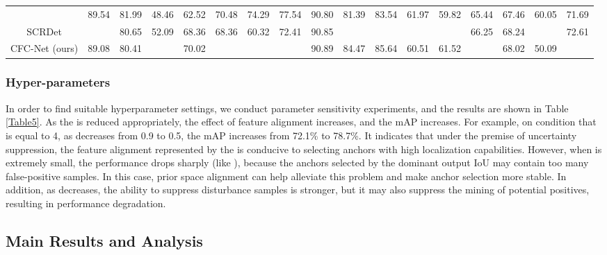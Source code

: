 \documentclass[journal]{IEEEtran}
\begin{document}
\begin{table*}[t]
{\begin{tabular}{c|ccccccccccccccc|c}
		\cite{yang2019r3det}   	    &89.54  &81.99 &48.46  &62.52   &70.48  &74.29  &77.54  &90.80  &81.39  &83.54  &61.97  &59.82  &65.44  &67.46  &60.05  &71.69 \\ 
		SCRDet\cite{yang2019scrdet}		                &   &80.65  &52.09  &68.36   &68.36  &60.32  &72.41  &90.85  &  &  &  &  &66.25  &68.24  &  &72.61\\ 
		CFC-Net (ours)  												       &89.08  &80.41  &   &70.02  &  &  &  &90.89  &84.47  &85.64  &60.51  &61.52  & &68.02  &50.09 & \\  
		\bottomrule
	\end{tabular}}
\label{Table7}
\end{table*}  

\subsubsection{Hyper-parameters}
In order to find suitable hyperparameter settings, we conduct parameter sensitivity experiments, and the results are shown in Table \ref{Table5}. As the  is  reduced appropriately, the effect of feature alignment increases, and the mAP increases. For example, on condition that  is equal to 4, as  decreases from 0.9 to 0.5, the mAP increases from 72.1\% to 78.7\%. It indicates that under the premise of uncertainty suppression, the feature alignment represented by the  is conducive  to selecting anchors with high localization capabilities. However, when  is extremely small, the performance drops sharply (like ), because the anchors selected by the dominant output IoU may contain too many false-positive samples. In this case, prior space alignment can help alleviate this problem and make anchor selection more stable. In addition, as  decreases, the ability to suppress disturbance samples is stronger, but it may also suppress the mining of potential positives, resulting in performance degradation.








\subsection{Main Results and Analysis}
\end{document}

